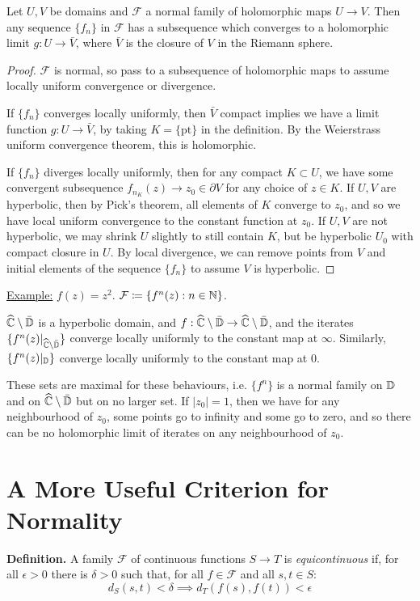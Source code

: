 \documentclass[10pt,a4paper]{article}
\begin{document}
\begin{lemma}
  Let $U, V$ be domains and $\mathcal{F}$ a normal family of holomorphic maps $U \to V$. Then any sequence $\{f_n\}$ in $\mathcal{F}$ has a subsequence which converges to a holomorphic limit $g: U \to \bar{V}$, where $\bar{V}$ is the closure of $V$ in the Riemann sphere.
\end{lemma}
\begin{proof}
  $\mathcal{F}$ is normal, so pass to a subsequence of holomorphic maps to assume locally uniform convergence or divergence.

  If $\{f_n\}$ converges locally uniformly, then $\bar{V}$ compact implies we have a limit function $g: U \to \bar{V}$, by taking $K = \{\text{pt}\}$ in the definition. By the Weierstrass uniform convergence theorem, this is holomorphic.

  If $\{f_n\}$ diverges locally uniformly, then for any compact $K \subset U$, we have some convergent subsequence $f_{n_K}(z) \to z_0 \in \partial V$ for any choice of $z \in K$. If $U, V$ are hyperbolic, then by Pick's theorem, all elements of $K$ converge to $z_0$, and so we have local uniform convergence to the constant function at $z_0$. If $U, V$ are not hyperbolic, we may shrink $U$ slightly to still contain $K$, but be hyperbolic $U_0$ with compact closure in $U$.
  By local divergence, we can remove points from $V$ and initial elements of the sequence $\{f_n\}$ to assume $V$ is hyperbolic.
\end{proof}

\underline{Example:} $f(z) = z^2$. $\mathcal{F} \coloneqq \{f^n(z) : n \in \mathbb{N}\}$.

$\widehat{\mathbb{C}} \setminus \bar{\mathbb{D}}$ is a hyperbolic domain, and $f:\widehat{\mathbb{C}}\setminus\bar{\mathbb{D}}\to\widehat{\mathbb{C}}\setminus\bar{\mathbb{D}}$, and the iterates $\{f^n(z)|_{\widehat{\mathbb{C}}\setminus\bar{\mathbb{D}}}\}$ converge locally uniformly to the constant map at $\infty$. Similarly, $\{f^n(z)|_{\mathbb{D}}\}$ converge locally uniformly to the constant map at 0.

These sets are maximal for these behaviours, i.e. $\{f^n\}$ is a normal family on $\mathbb{D}$ and on $\widehat{\mathbb{C}}\setminus\bar{\mathbb{D}}$ but on no larger set. If $|z_0| = 1$, then we have for any neighbourhood of $z_0$, some points go to infinity and some go to zero, and so there can be no holomorphic limit of iterates on any neighbourhood of $z_0$.

\section{A More Useful Criterion for Normality}
\textbf{Definition.} A family $\mathcal{F}$ of continuous functions $S \to T$ is \emph{equicontinuous} if, for all $\epsilon > 0$ there is $\delta >0$ such that, for all $f \in \mathcal{F}$ and all $s, t \in S$:
\[d_S(s,t) < \delta \implies d_T(f(s), f(t)) < \epsilon\]
\end{document}
